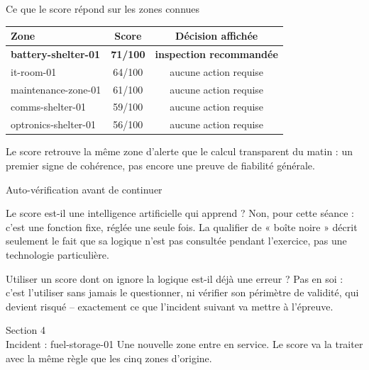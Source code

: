 \documentclass[aspectratio=169]{beamer}
\begin{document}
\begin{frame}{Ce que le score répond sur les zones connues}
  \small
  \begin{center}
  \begin{tabular}{@{}lcc@{}}
    \toprule
    Zone & Score & Décision affichée \\
    \midrule
    \textbf{battery-shelter-01} & \textbf{71/100} & \textbf{inspection recommandée} \\
    it-room-01 & 64/100 & aucune action requise \\
    maintenance-zone-01 & 61/100 & aucune action requise \\
    comms-shelter-01 & 59/100 & aucune action requise \\
    optronics-shelter-01 & 56/100 & aucune action requise \\
    \bottomrule
  \end{tabular}
  \end{center}
  \vfill
  \normalsize Le score retrouve la même zone d'alerte que le calcul transparent du matin : un premier signe de cohérence, pas encore une preuve de fiabilité générale.
\end{frame}

\begin{frame}{Auto-vérification avant de continuer}
  \small
  \begin{block}{Le score est-il une intelligence artificielle qui apprend ?}
    Non, pour cette séance : c'est une fonction fixe, réglée une seule fois. La qualifier de « boîte noire » décrit seulement le fait que sa logique n'est pas consultée pendant l'exercice, pas une technologie particulière.
  \end{block}
  \begin{block}{Utiliser un score dont on ignore la logique est-il déjà une erreur ?}
    Pas en soi : c'est l'utiliser sans jamais le questionner, ni vérifier son périmètre de validité, qui devient risqué -- exactement ce que l'incident suivant va mettre à l'épreuve.
  \end{block}
\end{frame}

\begin{frame}[plain]
  \centering
  \Huge Section 4\\[3mm]
  \Large Incident : fuel-storage-01
  \vfill
  \normalsize Une nouvelle zone entre en service. Le score va la traiter avec la même règle que les cinq zones d'origine.
\end{frame}
\end{document}
